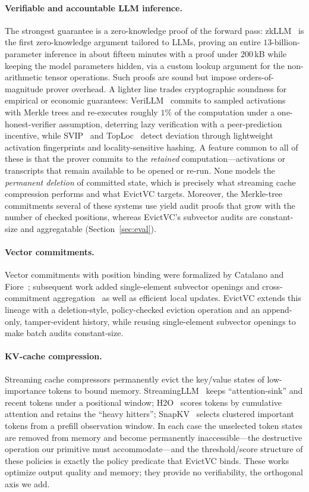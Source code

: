 \documentclass[version=submission]{iacrcc}
\theoremstyle{definition}
\begin{document}
\paragraph{Verifiable and accountable LLM inference.}
The strongest guarantee is a zero-knowledge proof of the forward pass:
zkLLM~\cite{zkllm} is the first zero-knowledge argument tailored to LLMs, proving
an entire $13$-billion-parameter inference in about fifteen minutes with a proof
under $200$\,kB while keeping the model parameters hidden, via a custom lookup
argument for the non-arithmetic tensor operations. Such proofs are sound but
impose orders-of-magnitude prover overhead. A lighter line trades cryptographic
soundness for empirical or economic guarantees: VeriLLM~\cite{verillm} commits to
sampled activations with Merkle trees and re-executes roughly $1\%$ of the
computation under a one-honest-verifier assumption, deterring lazy verification
with a peer-prediction incentive, while SVIP~\cite{svip} and
TopLoc~\cite{toploc} detect deviation through lightweight activation fingerprints
and locality-sensitive hashing. A feature common to all of these is that the
prover commits to the \emph{retained} computation---activations or transcripts
that remain available to be opened or re-run. None models the \emph{permanent
deletion} of committed state, which is precisely what streaming cache compression
performs and what EvictVC targets. Moreover, the Merkle-tree commitments several
of these systems use yield audit proofs that grow with the number of checked
positions, whereas EvictVC's subvector audits are constant-size and aggregatable
(Section~\ref{sec:eval}).

\paragraph{Vector commitments.}
Vector commitments with position binding were formalized by Catalano and
Fiore~\cite{cf13}; subsequent work added single-element subvector openings and
cross-commitment aggregation~\cite{tomescu} as well as efficient local updates.
EvictVC extends this lineage with a deletion-style, policy-checked eviction
operation and an append-only, tamper-evident history, while reusing
single-element subvector openings to make batch audits constant-size.

\paragraph{KV-cache compression.}
Streaming cache compressors permanently evict the key/value states of
low-importance tokens to bound memory. StreamingLLM~\cite{streamingllm} keeps
``attention-sink'' and recent tokens under a positional window; H2O~\cite{h2o}
scores tokens by cumulative attention and retains the ``heavy hitters'';
SnapKV~\cite{snapkv} selects clustered important tokens from a prefill
observation window. In each case the unselected token states are removed from
memory and become permanently inaccessible---the destructive operation our
primitive must accommodate---and the threshold/score structure of these policies
is exactly the policy predicate that EvictVC binds. These works optimize output
quality and memory; they provide no verifiability, the orthogonal axis we add.
\end{document}
